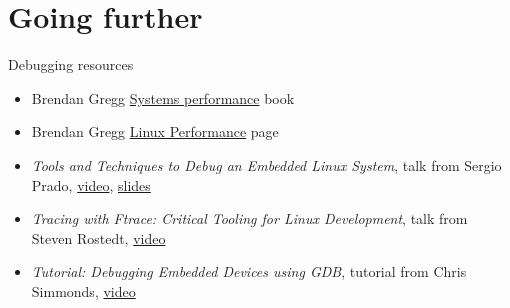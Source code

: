 \section{Going further}

\begin{frame}{Debugging resources}
  \begin{itemize}
  \item Brendan Gregg
    \href{https://www.brendangregg.com/systems-performance-2nd-edition-book.html}{Systems
      performance} book
  \item Brendan Gregg
    \href{https://www.brendangregg.com/linuxperf.html}{Linux
      Performance} page
  \item {\em Tools and Techniques to Debug an Embedded Linux System},
    talk from Sergio Prado,
    \href{https://www.youtube.com/watch?v=dgPkZnGuIMg}{video},
    \href{https://elinux.org/images/c/cf/Slides-debugging.pdf}{slides}
  \item {\em Tracing with Ftrace: Critical Tooling for Linux
      Development}, talk from Steven Rostedt,
    \href{https://www.youtube.com/watch?v=mlxqpNvfvEQ}{video}
  \item {\em Tutorial: Debugging Embedded Devices using GDB}, tutorial
    from Chris Simmonds,
    \href{https://www.youtube.com/watch?v=JGhAgd2a_Ck}{video}
  \end{itemize}
\end{frame}

